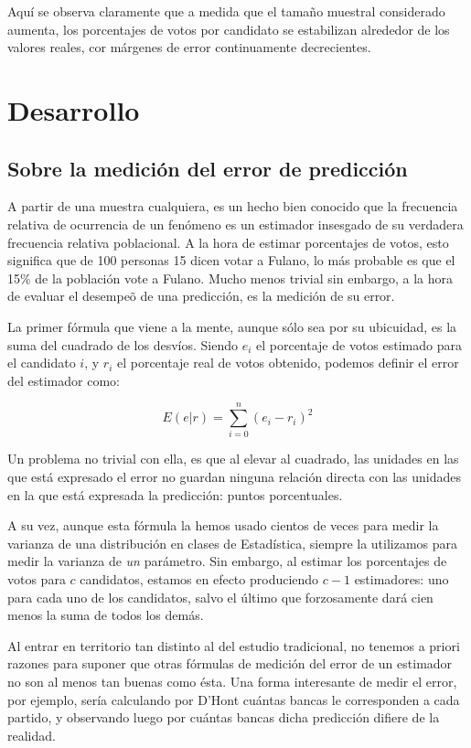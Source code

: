\documentclass[12pt, a4paper]{article}
\begin{document}
Aqu\'i se observa claramente que a medida que el tama\~no muestral considerado aumenta, los porcentajes de votos por candidato se estabilizan alrededor de los valores reales, cor m\'argenes de error continuamente decrecientes.

\section{Desarrollo}

\subsection{Sobre la medici\'on del error de predicci\'on}

A partir de una muestra cualquiera, es un hecho bien conocido que la frecuencia relativa de ocurrencia de un fen\'omeno es un estimador insesgado de su verdadera frecuencia relativa poblacional. A la hora de estimar porcentajes de votos, esto significa que de 100 personas 15 dicen votar a Fulano, lo m\'as probable es que el 15\% de la poblaci\'on vote a Fulano. Mucho menos trivial sin embargo, a la hora de evaluar el desempe\~o de una predicci\'on, es la medici\'on de su error.

La primer f\'ormula que viene a la mente, aunque s\'olo sea por su ubicuidad, es la suma del cuadrado de los desv\'ios. Siendo $e_{i}$ el porcentaje de votos estimado para el candidato $i$, y $r_{i}$ el porcentaje real de votos obtenido, podemos definir el error del estimador como:

$$ E(e|r) = \sum\limits_{i=0}^{n} (e_{i} - r_{i})^2 $$

Un problema no trivial con ella, es que al elevar al cuadrado, las unidades en las que est\'a expresado el error no guardan ninguna relaci\'on directa con las unidades en la que est\'a expresada la predicci\'on: puntos porcentuales.

A su vez, aunque esta f\'ormula la hemos usado cientos de veces para medir la varianza de una distribuci\'on en clases de Estad\'istica, siempre la utilizamos para medir la varianza de \emph{un} par\'ametro. Sin embargo, al estimar los porcentajes de votos para $c$ candidatos, estamos en efecto produciendo $c-1$ estimadores: uno para cada uno de los candidatos, salvo el \'ultimo que forzosamente dar\'a cien menos la suma de todos los dem\'as.

Al entrar en territorio tan distinto al del estudio tradicional, no tenemos a priori razones para suponer que otras f\'ormulas de medici\'on del error de un estimador no son al menos tan buenas como \'esta. Una forma interesante de medir el error, por ejemplo, ser\'ia calculando por D'Hont cu\'antas bancas le corresponden a cada partido, y observando luego por cu\'antas bancas dicha predicci\'on difiere de la realidad.
\end{document}
